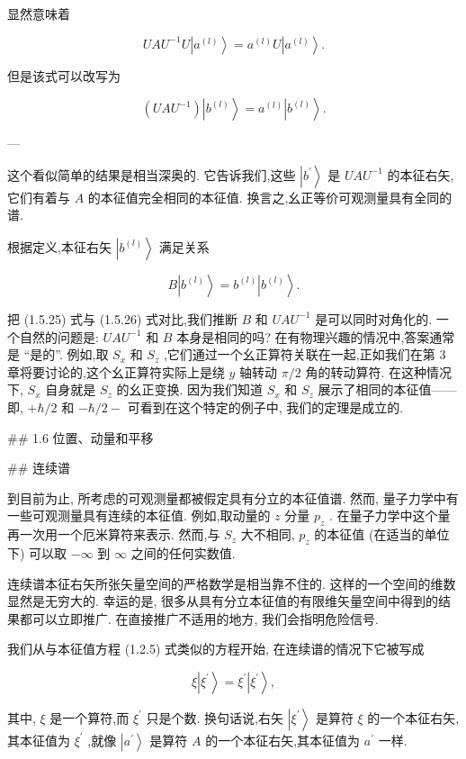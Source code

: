 \documentclass[lang=cn,newtx,10pt,scheme=chinese,thmcnt=section]{elegantbook}
\begin{document}
显然意味着

$$
{UA}{U}^{-1}U\left| {a}^{\left( l\right) }\right\rangle = {a}^{\left( l\right) }U\left| {a}^{\left( l\right) }\right\rangle . \tag{1.5.24}
$$

但是该式可以改写为

$$
\left( {{UA}{U}^{-1}}\right) \left| {b}^{\left( l\right) }\right\rangle = {a}^{\left( l\right) }\left| {b}^{\left( l\right) }\right\rangle . \tag{1.5.25}
$$

---

这个看似简单的结果是相当深奥的. 它告诉我们,这些 $\left| {b}^{\prime }\right\rangle$ 是 ${UA}{U}^{-1}$ 的本征右矢, 它们有着与 $A$ 的本征值完全相同的本征值. 换言之,幺正等价可观测量具有全同的谱.

根据定义,本征右矢 $\left| {b}^{\left( l\right) }\right\rangle$ 满足关系

$$
B\left| {b}^{\left( l\right) }\right\rangle = {b}^{\left( l\right) }\left| {b}^{\left( l\right) }\right\rangle . \tag{1.5.26}
$$

把 (1.5.25) 式与 (1.5.26) 式对比,我们推断 $B$ 和 ${UA}{U}^{-1}$ 是可以同时对角化的. 一个自然的问题是: ${UA}{U}^{-1}$ 和 $B$ 本身是相同的吗? 在有物理兴趣的情况中,答案通常是 “是的”. 例如,取 ${S}_{x}$ 和 ${S}_{z}$ ,它们通过一个幺正算符关联在一起,正如我们在第 3 章将要讨论的,这个幺正算符实际上是绕 $y$ 轴转动 $\pi /2$ 角的转动算符. 在这种情况下, ${S}_{x}$ 自身就是 ${S}_{z}$ 的幺正变换. 因为我们知道 ${S}_{x}$ 和 ${S}_{z}$ 展示了相同的本征值——即, $+ \hbar /2$ 和 $- \hbar /2 -$ 可看到在这个特定的例子中, 我们的定理是成立的.

## 1.6 位置、动量和平移

## 连续谱

到目前为止, 所考虑的可观测量都被假定具有分立的本征值谱. 然而, 量子力学中有一些可观测量具有连续的本征值. 例如,取动量的 $z$ 分量 ${p}_{z}$ . 在量子力学中这个量再一次用一个厄米算符来表示. 然而,与 ${S}_{z}$ 大不相同, ${p}_{z}$ 的本征值 (在适当的单位下) 可以取 $- \infty$ 到 $\infty$ 之间的任何实数值.

连续谱本征右矢所张矢量空间的严格数学是相当靠不住的. 这样的一个空间的维数显然是无穷大的. 幸运的是, 很多从具有分立本征值的有限维矢量空间中得到的结果都可以立即推广. 在直接推广不适用的地方, 我们会指明危险信号.

我们从与本征值方程 (1.2.5) 式类似的方程开始, 在连续谱的情况下它被写成

$$
\xi \left| {\xi }^{\prime }\right\rangle = {\xi }^{\prime }\left| {\xi }^{\prime }\right\rangle , \tag{1.6.1}
$$

其中, $\xi$ 是一个算符,而 ${\xi }^{\prime }$ 只是个数. 换句话说,右矢 $\left| {\xi }^{\prime }\right\rangle$ 是算符 $\xi$ 的一个本征右矢,其本征值为 ${\xi }^{\prime }$ ,就像 $\left| {a}^{\prime }\right\rangle$ 是算符 $A$ 的一个本征右矢,其本征值为 ${a}^{\prime }$ 一样.
\end{document}
